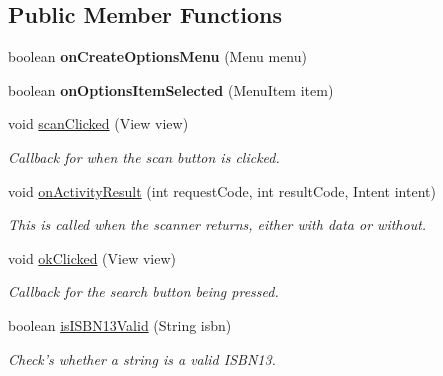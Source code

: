 \subsection*{Public Member Functions}
\begin{DoxyCompactItemize}
\item 
\hypertarget{classcom_1_1lakehead_1_1textbookmarket_1_1_add_listing_activity_aa7a002a9dc6dabc80268d5e9bb6e42d4}{boolean {\bfseries on\-Create\-Options\-Menu} (Menu menu)}\label{classcom_1_1lakehead_1_1textbookmarket_1_1_add_listing_activity_aa7a002a9dc6dabc80268d5e9bb6e42d4}

\item 
\hypertarget{classcom_1_1lakehead_1_1textbookmarket_1_1_add_listing_activity_ad50cd19247dbc18ab478239416c9c949}{boolean {\bfseries on\-Options\-Item\-Selected} (Menu\-Item item)}\label{classcom_1_1lakehead_1_1textbookmarket_1_1_add_listing_activity_ad50cd19247dbc18ab478239416c9c949}

\item 
void \hyperlink{classcom_1_1lakehead_1_1textbookmarket_1_1_add_listing_activity_a8d5a41204959c78b58c89b8ac351894e}{scan\-Clicked} (View view)
\begin{DoxyCompactList}\small\item\em Callback for when the scan button is clicked. \end{DoxyCompactList}\item 
void \hyperlink{classcom_1_1lakehead_1_1textbookmarket_1_1_add_listing_activity_a83eac3fe3a33050678d7c6900f3a0886}{on\-Activity\-Result} (int request\-Code, int result\-Code, Intent intent)
\begin{DoxyCompactList}\small\item\em This is called when the scanner returns, either with data or without. \end{DoxyCompactList}\item 
void \hyperlink{classcom_1_1lakehead_1_1textbookmarket_1_1_add_listing_activity_af603e2686d7c1475438df50815c2010d}{ok\-Clicked} (View view)
\begin{DoxyCompactList}\small\item\em Callback for the search button being pressed. \end{DoxyCompactList}\item 
boolean \hyperlink{classcom_1_1lakehead_1_1textbookmarket_1_1_add_listing_activity_a02c4ac2f0a5165b0ab7ad836d9ff1e31}{is\-I\-S\-B\-N13\-Valid} (String isbn)
\begin{DoxyCompactList}\small\item\em Check's whether a string is a valid I\-S\-B\-N13. \end{DoxyCompactList}\end{DoxyCompactItemize}
